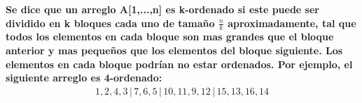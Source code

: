 \textbf{Se dice que un arreglo A[1,...,n] es k-ordenado si este puede ser dividido en k bloques cada uno de tamaño $\frac{n}{k}$ aproximadamente, tal que todos los elementos en cada bloque son mas grandes que el bloque anterior y mas pequeños que los elementos del bloque siguiente. Los elementos en cada bloque podrían no estar ordenados. Por ejemplo, el siguiente arreglo es 4-ordenado:
\begin{align*}
    1,2,4,3 \,|\, 7,6,5 \,|\, 10,11,9,12 \,|\, 15,13,16,14\\
\end{align*}}

